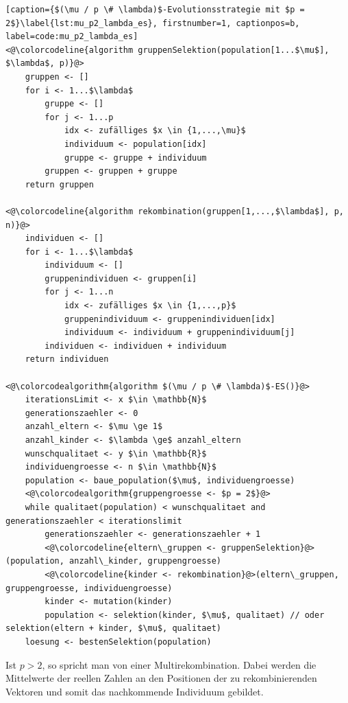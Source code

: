 \begin{lstlisting}[caption={$(\mu / p \# \lambda)$-Evolutionsstrategie mit $p = 2$}\label{lst:mu_p2_lambda_es}, firstnumber=1, captionpos=b, label=code:mu_p2_lambda_es]
<@\colorcodeline{algorithm gruppenSelektion(population[1...$\mu$], $\lambda$, p)}@>
	gruppen <- []
	for i <- 1...$\lambda$
		gruppe <- []
		for j <- 1...p
			idx <- zufälliges $x \in {1,...,\mu}$
			individuum <- population[idx]
			gruppe <- gruppe + individuum
		gruppen <- gruppen + gruppe
	return gruppen

<@\colorcodeline{algorithm rekombination(gruppen[1,...,$\lambda$], p, n)}@>
	individuen <- []
	for i <- 1...$\lambda$
		individuum <- []
		gruppenindividuen <- gruppen[i]
		for j <- 1...n
			idx <- zufälliges $x \in {1,...,p}$
			gruppenindividuum <- gruppenindividuen[idx]
			individuum <- individuum + gruppenindividuum[j]
		individuen <- individuen + individuum
	return individuen

<@\colorcodealgorithm{algorithm $(\mu / p \# \lambda)$-ES()}@>
	iterationsLimit <- x $\in \mathbb{N}$
	generationszaehler <- 0
	anzahl_eltern <- $\mu \ge 1$
	anzahl_kinder <- $\lambda \ge$ anzahl_eltern
	wunschqualitaet <- y $\in \mathbb{R}$
	individuengroesse <- n $\in \mathbb{N}$
	population <- baue_population($\mu$, individuengroesse)
	<@\colorcodealgorithm{gruppengroesse <- $p = 2$}@>
	while qualitaet(population) < wunschqualitaet and generationszaehler < iterationslimit
		generationszaehler <- generationszaehler + 1
		<@\colorcodeline{eltern\_gruppen <- gruppenSelektion}@>(population, anzahl\_kinder, gruppengroesse)
		<@\colorcodeline{kinder <- rekombination}@>(eltern\_gruppen, gruppengroesse, individuengroesse)
		kinder <- mutation(kinder)
		population <- selektion(kinder, $\mu$, qualitaet) // oder selektion(eltern + kinder, $\mu$, qualitaet)
	loesung <- bestenSelektion(population)
\end{lstlisting}


Ist $p > 2$, so spricht man von einer Multirekombination.
Dabei werden die Mittelwerte der reellen Zahlen an den Positionen der zu rekombinierenden Vektoren und somit das nachkommende Individuum gebildet.

